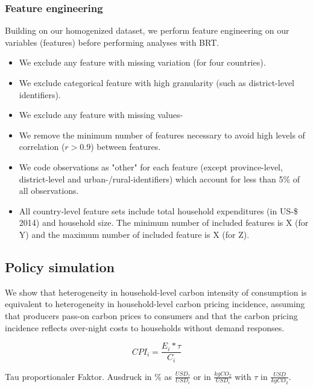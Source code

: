 \documentclass[12pt, a4paper]{article}
\begin{document}

\subsubsection{Feature engineering} \label{sec:featureengineering}

Building on our homogenized dataset, we perform feature engineering on our variables (features) before performing analyses with BRT.

\begin{itemize}
    \item We exclude any feature with missing variation (for four countries).
    \item We exclude categorical feature with high granularity (such as district-level identifiers).
    \item We exclude any feature with missing values-
    \item We remove the minimum number of features necessary to avoid high levels of correlation ($r>0.9$) between features.
    \item We code observations as "other" for each feature (except province-level, district-level and urban-/rural-identifiers) which account for less than 5\% of all observations.
    \item All country-level feature sets include total household expenditures (in US-\$ 2014) and household size. The minimum number of included features is X (for Y) and the maximum number of included feature is X (for Z).
\end{itemize}

\subsection{Policy simulation}\label{sec:policysimulation}

We show that heterogeneity in household-level carbon intensity of consumption is equivalent to heterogeneity in household-level carbon pricing incidence, assuming that producers pass-on carbon prices to consumers and that the carbon pricing incidence reflects over-night costs to households without demand responses.

\begin{equation}
    CPI_{i} = \frac{E_{i}*\tau}{C_{i}}
\end{equation}

Tau proportionaler Faktor. Ausdruck in \% as $\frac{USD_{\tau}}{USD_{i}}$ or in $\frac{kgCO_{2}}{USD_{i}}$ with $\tau$ in $\frac{USD}{kgCO_{2}}$.
\end{document}
